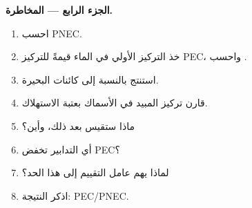 \begin{problem}
\medskip\noindent\textbf{الجزء الرابع --- المخاطرة.}
\begin{enumerate}[resume]
  \item احسب PNEC.
  \item خذ التركيز الأولي في الماء قيمةً للتركيز PEC، واحسب .
  \item استنتج بالنسبة إلى كائنات البحيرة.
  \item قارن تركيز المبيد في الأسماك بعتبة الاستهلاك.
  \item ماذا ستقيس بعد ذلك، وأين؟
  \item أي التدابير تخفض PEC؟
  \item لماذا يهم عامل التقييم إلى هذا الحد؟
  \item اذكر النتيجة:  PEC/PNEC.
\end{enumerate}
\end{problem}
